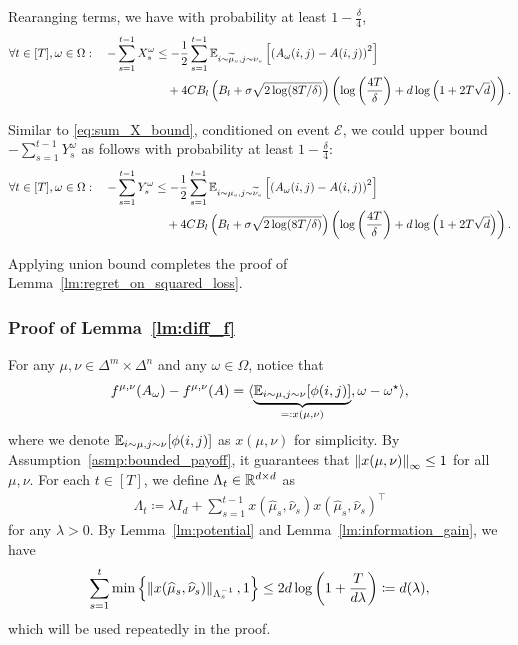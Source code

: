 Rearanging terms, we have with probability at least $1-\frac{\delta}{4}$,
\begin{align}\label{eq:sum_X_bound_proof}
    \forall t\in[T],\omega\in\Omega:\quad -\sum_{s=1}^{t-1} X_s^\omega &\leq - \frac{1}{2} \sum_{s=1}^{t-1}\mathbb{E}_{i\sim\widetilde{\mu}_s,j\sim\nu_s}\left[\left(A_\omega(i,j)-A(i,j)\right)^2\right]\notag\\
    &\quad+ 4C B_l\left(B_l+\sigma\sqrt{2\log(8T/\delta)}\right)  \left(\log\left(\frac{4T}{\delta}\right)+d\log\left(1+2T\sqrt{d}\right)\right).  
\end{align}

Similar to \eqref{eq:sum_X_bound}, conditioned on event $\mathcal{E}$, we could upper bound $-\sum_{s=1}^{t-1} Y_s^\omega$ as follows with probability at least $1-\frac{\delta}{4}$:
\begin{align}\label{eq:sum_Y_bound_proof}
    \forall t\in[T],\omega\in\Omega:\quad -\sum_{s=1}^{t-1} Y_s^\omega &\leq - \frac{1}{2} \sum_{s=1}^{t-1}\mathbb{E}_{i\sim\mu_s,j\sim\widetilde{\nu}_s}\left[\left(A_\omega(i,j)-A(i,j)\right)^2\right]\notag\\
    &\quad+ 4C B_l\left(B_l+\sigma\sqrt{2\log(8T/\delta)}\right)  \left(\log\left(\frac{4T}{\delta}\right)+d\log\left(1+2T\sqrt{d}\right)\right) .  
\end{align}

Applying union bound completes the proof of Lemma~\ref{lm:regret_on_squared_loss}.



\subsubsection{Proof of Lemma~\ref{lm:diff_f}}

For any $\mu,\nu\in\Delta^m\times\Delta^n$ and any $\omega\in\Omega$, notice that
\begin{align}\label{eq:innerprod}
    f^{\mu,\nu}(A_\omega) - f^{\mu,\nu}(A) = \langle\underbrace{\mathbb{E}_{i\sim\mu,j\sim\nu}[\phi(i,j)]}_{=: x(\mu,\nu)},\omega-\omega^\star\rangle,
\end{align}
where we denote $\mathbb{E}_{i\sim\mu,j\sim\nu}[\phi(i,j)]$ as $x(\mu,\nu)$ for simplicity. By Assumption~\ref{asmp:bounded_payoff}, it guarantees that $\left\| x(\mu,\nu) \right\|_\infty\leq 1$ for all $\mu,\nu$.
For each $t\in[T]$, we define $\Lambda_t\in\mathbb{R}^{d\times d}$ as
\begin{align}\label{eq:Lambda}
    \Lambda_t\coloneqq \lambda I_d + \sum_{s=1}^{t-1} x(\widehat{\mu}_s,\widehat{\nu}_s)x(\widehat{\mu}_s,\widehat{\nu}_s)^\top
\end{align}
for any $\lambda>0$. By Lemma~\ref{lm:potential} and Lemma~\ref{lm:information_gain}, we have
\begin{align}\label{eq:|x|_bound}
    \sum_{s=1}^t \min\left\{ \left\| x(\widehat{\mu}_s,\widehat{\nu}_s) \right\|_{\Lambda_{s}^{-1}},1\right\}\leq 2d\log\left(1+\frac{T}{d\lambda}\right)\coloneqq d(\lambda) ,
\end{align}
which will be used repeatedly in the proof.

